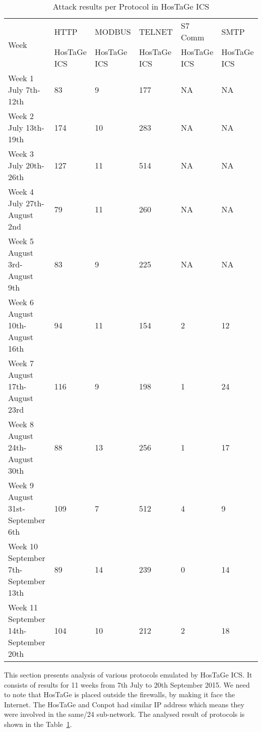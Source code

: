 \documentclass[article,msc=informatik,type=msc,colorback,accentcolor=tud9c]{tudthesis}
\begin{document}
 	\begin{table}[H]
 	\centering
 	\caption{Attack results per Protocol in HosTaGe ICS}
 	\label{tb:Attack results per Protocol in HosTaGe ICS}
 	\begin{tabular}{|l|l|l|l|l|l|}
 	\hline
 	\multirow{2}{*}{Week}                 & HTTP        & MODBUS      & TELNET      & S7 Comm     & SMTP        \\ \cline{2-6} 
 	                                      & HosTaGe ICS & HosTaGe ICS & HosTaGe ICS & HosTaGe ICS & HosTaGe ICS \\ \hline
 	Week 1 July 7th-12th                  & 83          & 9           & 177         & NA          & NA          \\ \hline
 	Week 2 July 13th-19th                 & 174         & 10          & 283         & NA          & NA          \\ \hline
 	Week 3 July 20th-26th                 & 127         & 11          & 514         & NA          & NA          \\ \hline
 	Week 4 July 27th-August 2nd           & 79          & 11          & 260         & NA          & NA          \\ \hline
 	Week 5 August 3rd-August 9th          & 83          & 9           & 225         & NA          & NA          \\ \hline
 	Week 6 August 10th-August 16th        & 94          & 11          & 154         & 2           & 12          \\ \hline
 	Week 7 August 17th-August 23rd        & 116         & 9           & 198         & 1           & 24          \\ \hline
 	Week 8 August 24th-August 30th        & 88          & 13          & 256         & 1           & 17          \\ \hline
 	Week 9 August 31st-September 6th      & 109         & 7           & 512         & 4           & 9           \\ \hline
 	Week 10 September 7th-September 13th  & 89          & 14          & 239         & 0           & 14          \\ \hline
 	Week 11 September 14th-September 20th & 104         & 10          & 212         & 2           & 18          \\ \hline
 	\end{tabular}
 	\end{table}
 	
 	
 	This section presents analysis of various protocols emulated by HosTaGe ICS. It consists of results for 11 weeks from 7th July to 20th September 2015. We need to note that HosTaGe is placed outside the firewalls, by making it face the Internet. The HosTaGe and Conpot had similar \ac{IP} address which means they were involved in the same/24 sub-network. The analysed result of protocols is shown in the Table~\ref{tb:Attack results per Protocol in HosTaGe ICS}.
 
\end{document}

